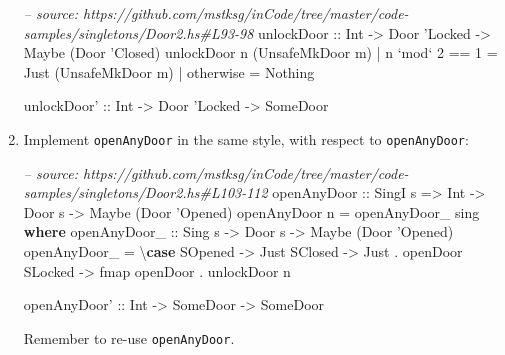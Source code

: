 \documentclass[]{article}
\newenvironment{Shaded}{}{}
\newcommand{\KeywordTok}[1]{\textcolor[rgb]{0.00,0.44,0.13}{\textbf{#1}}}
\newcommand{\DataTypeTok}[1]{\textcolor[rgb]{0.56,0.13,0.00}{#1}}
\newcommand{\DecValTok}[1]{\textcolor[rgb]{0.25,0.63,0.44}{#1}}
\newcommand{\CharTok}[1]{\textcolor[rgb]{0.25,0.44,0.63}{#1}}
\newcommand{\CommentTok}[1]{\textcolor[rgb]{0.38,0.63,0.69}{\textit{#1}}}
\newcommand{\OtherTok}[1]{\textcolor[rgb]{0.00,0.44,0.13}{#1}}
\newcommand{\FunctionTok}[1]{\textcolor[rgb]{0.02,0.16,0.49}{#1}}
\newcommand{\NormalTok}[1]{#1}
\begin{document}
\begin{enumerate}
\begin{Shaded}
\begin{Highlighting}[]
\CommentTok{-- source: https://github.com/mstksg/inCode/tree/master/code-samples/singletons/Door2.hs#L93-98}
\OtherTok{unlockDoor ::} \DataTypeTok{Int} \OtherTok{->} \DataTypeTok{Door} \CharTok{'Locked -> Maybe (Door '}\DataTypeTok{Closed}\NormalTok{)}
\NormalTok{unlockDoor n (}\DataTypeTok{UnsafeMkDoor}\NormalTok{ m)}
    \FunctionTok{|}\NormalTok{ n }\OtherTok{`mod`} \DecValTok{2} \FunctionTok{==} \DecValTok{1} \FunctionTok{=} \DataTypeTok{Just}\NormalTok{ (}\DataTypeTok{UnsafeMkDoor}\NormalTok{ m)}
    \FunctionTok{|}\NormalTok{ otherwise      }\FunctionTok{=} \DataTypeTok{Nothing}

\OtherTok{unlockDoor' ::} \DataTypeTok{Int} \OtherTok{->} \DataTypeTok{Door} \CharTok{'Locked -> SomeDoor}
\end{Highlighting}
\end{Shaded}
\item
  Implement \texttt{openAnyDoor\textquotesingle{}} in the same style, with
  respect to \texttt{openAnyDoor}:

\begin{Shaded}
\begin{Highlighting}[]
\CommentTok{-- source: https://github.com/mstksg/inCode/tree/master/code-samples/singletons/Door2.hs#L103-112}
\OtherTok{openAnyDoor ::} \DataTypeTok{SingI}\NormalTok{ s }\OtherTok{=>} \DataTypeTok{Int} \OtherTok{->} \DataTypeTok{Door}\NormalTok{ s }\OtherTok{->} \DataTypeTok{Maybe}\NormalTok{ (}\DataTypeTok{Door} \CharTok{'Opened)}
\NormalTok{openAnyDoor n }\FunctionTok{=}\NormalTok{ openAnyDoor_ sing}
  \KeywordTok{where}
\OtherTok{    openAnyDoor_ ::} \DataTypeTok{Sing}\NormalTok{ s }\OtherTok{->} \DataTypeTok{Door}\NormalTok{ s }\OtherTok{->} \DataTypeTok{Maybe}\NormalTok{ (}\DataTypeTok{Door} \CharTok{'Opened)}
\NormalTok{    openAnyDoor_ }\FunctionTok{=}\NormalTok{ \textbackslash{}}\KeywordTok{case}
      \DataTypeTok{SOpened} \OtherTok{->} \DataTypeTok{Just}
      \DataTypeTok{SClosed} \OtherTok{->} \DataTypeTok{Just} \FunctionTok{.}\NormalTok{ openDoor}
      \DataTypeTok{SLocked} \OtherTok{->}\NormalTok{ fmap openDoor }\FunctionTok{.}\NormalTok{ unlockDoor n}

\OtherTok{openAnyDoor' ::} \DataTypeTok{Int} \OtherTok{->} \DataTypeTok{SomeDoor} \OtherTok{->} \DataTypeTok{SomeDoor}
\end{Highlighting}
\end{Shaded}

  Remember to re-use \texttt{openAnyDoor}.
\end{enumerate}
\end{document}
